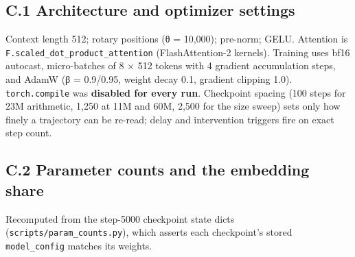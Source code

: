 \documentclass[11pt]{article}
\begin{document}
\subsection{C.1 Architecture and optimizer settings}\label{c.1-architecture-and-optimizer-settings}

Context length 512; rotary positions (θ = 10,000); pre-norm; GELU. Attention is
\texttt{F.scaled\_dot\_product\_attention} (FlashAttention-2 kernels). Training uses bf16 autocast,
micro-batches of 8 × 512 tokens with 4 gradient accumulation steps, and AdamW
(β = 0.9/0.95, weight decay 0.1, gradient clipping 1.0). \texttt{torch.compile} was
\textbf{disabled for every run}. Checkpoint spacing (100 steps for 23M arithmetic, 1,250 at
11M and 60M, 2,500 for the size sweep) sets only how finely a trajectory can be re-read;
delay and intervention triggers fire on exact step count.

\subsection{C.2 Parameter counts and the embedding share}\label{c.2-parameter-counts-and-the-embedding-share}

Recomputed from the step-5000 checkpoint state dicts (\texttt{scripts/param\_counts.py}), which
asserts each checkpoint's stored \texttt{model\_config} matches its weights.
\end{document}
